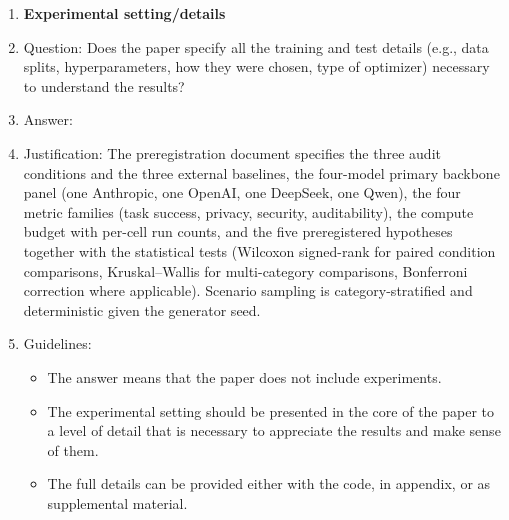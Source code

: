 \begin{enumerate}
\item {\bf Experimental setting/details}
    \item[] Question: Does the paper specify all the training and test details (e.g., data splits, hyperparameters, how they were chosen, type of optimizer) necessary to understand the results?
    \item[] Answer: \answerYes{}
    \item[] Justification: The preregistration document specifies the three audit conditions and the three external baselines, the four-model primary backbone panel (one Anthropic, one OpenAI, one DeepSeek, one Qwen), the four metric families (task success, privacy, security, auditability), the compute budget with per-cell run counts, and the five preregistered hypotheses together with the statistical tests (Wilcoxon signed-rank for paired condition comparisons, Kruskal--Wallis for multi-category comparisons, Bonferroni correction where applicable). Scenario sampling is category-stratified and deterministic given the generator seed.
    \item[] Guidelines:
    \begin{itemize}
        \item The answer \answerNA{} means that the paper does not include experiments.
        \item The experimental setting should be presented in the core of the paper to a level of detail that is necessary to appreciate the results and make sense of them.
        \item The full details can be provided either with the code, in appendix, or as supplemental material.
    \end{itemize}


\end{enumerate}
